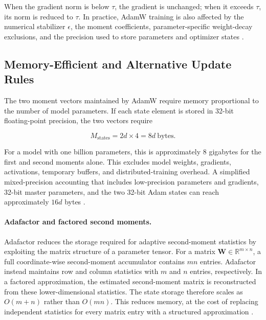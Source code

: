 When the gradient norm is below $\tau$, the gradient is unchanged; when
it exceeds $\tau$, its norm is reduced to $\tau$. In practice, AdamW
training is also affected by the numerical stabilizer $\epsilon$, the
moment coefficients, parameter-specific weight-decay exclusions, and
the precision used to store parameters and optimizer states
\parencite{Ranganath2026Navigating}.

\subsection{Memory-Efficient and Alternative Update Rules}
\label{subsec:optimization-memory-efficient}

The two moment vectors maintained by AdamW require memory proportional
to the number of model parameters. If each state element is stored in
32-bit floating-point precision, the two vectors require

\begin{equation}
    M_{\mathrm{states}}
    =
    2d\times4
    =
    8d\ \text{bytes}.
    \label{eq:opt-adam-state-memory}
\end{equation}

For a model with one billion parameters, this is approximately
$8$ gigabytes for the first and second moments alone. This excludes
model weights, gradients, activations, temporary buffers, and
distributed-training overhead. A simplified mixed-precision accounting
that includes low-precision parameters and gradients, 32-bit master
parameters, and the two 32-bit Adam states can reach approximately
$16d$ bytes \parencite{Ranganath2026Navigating}.

\paragraph{Adafactor and factored second moments.}
Adafactor reduces the storage required for adaptive second-moment
statistics by exploiting the matrix structure of a parameter tensor.
For a matrix $\mathbf{W}\in\mathbb{R}^{m\times n}$, a full coordinate-wise
second-moment accumulator contains $mn$ entries. Adafactor instead
maintains row and column statistics with $m$ and $n$ entries,
respectively. In a factored approximation, the estimated second-moment
matrix is reconstructed from these lower-dimensional statistics.
The state storage therefore scales as $O(m+n)$ rather than $O(mn)$.
This reduces memory, at the cost of replacing independent statistics
for every matrix entry with a structured approximation
\parencite{Ranganath2026Navigating}.

